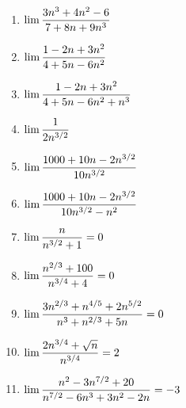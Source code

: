 \begin{multicols}{2}
    \begin{enumerate}
        \item $\displaystyle \lim \frac{3n^3+4n^2-6}{7+8n+9n^3} $
        \item $\displaystyle \lim \frac{1-2n+3n^2}{4+5n-6n^2} $
        \item $\displaystyle \lim \frac{1-2n+3n^2}{4+5n-6n^2+n^3} $
        \item $\displaystyle \lim \frac{1}{2 n^{3/2}} $
        \item $\displaystyle \lim \frac{1000 + 10 n - 2 n^{3/2}}{10 n^{3/2}} $
        \item $\displaystyle \lim \frac{1000 + 10 n - 2 n^{3/2}}{10 n^{3/2}-n^2} $

        \item $\displaystyle \lim \frac{n}{n^{3/2}+1} = 0 $
        \item $\displaystyle \lim \frac{n^{2/3}+100}{n^{3/4}+4} = 0 $
        \item $\displaystyle \lim \frac{3n^{2/3}+n^{4/5}+2n^{5/2}}{n^3+n^{2/3}+5n} = 0 $
        \item $\displaystyle \lim \frac{2n^{3/4}+\sqrt n}{n^{3/4}} = 2 $
        \item $\displaystyle \lim \frac{n^2-3n^{7/2}+20}{n^{7/2}-6n^3+3n^2-2n} = -3$
\end{enumerate}
\end{multicols}
